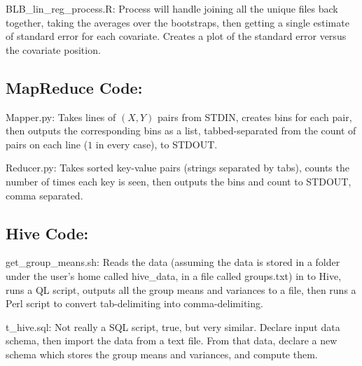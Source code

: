 \documentclass[12pt]{article}
\begin{document}
BLB\_lin\_reg\_process.R:
Process will handle joining all the unique files back together, taking the averages over the bootstraps, then getting a single estimate of standard error for each covariate. Creates a plot of the standard error versus the covariate position.


\newpage
\subsection*{MapReduce Code:}
Mapper.py:
Takes lines of $(X,Y)$ pairs from STDIN, creates bins for each pair, then outputs the corresponding bins as a list, tabbed-separated from the count of pairs on each line ($1$ in every case), to STDOUT.


Reducer.py:
Takes sorted key-value pairs (strings separated by tabs), counts the number of times each key is seen, then outputs the bins and count to STDOUT, comma separated.


\newpage
\subsection*{Hive Code:}
get\_group\_means.sh:
Reads the data (assuming the data is stored in a folder under the user's home called hive\_data, in a file called groups.txt) in to Hive, runs a QL script, outputs all the group means and variances to a file, then runs a Perl script to convert tab-delimiting into comma-delimiting.


t\_hive.sql:
Not really a SQL script, true, but very similar. Declare input data schema, then import the data from a text file. From that data, declare a new schema which stores the group means and variances, and compute them. 

\end{document}
